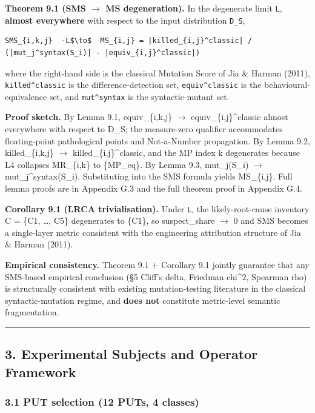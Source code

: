 \documentclass[review,12pt,authoryear]{elsarticle}
\begin{document}
\textbf{Theorem 9.1 (SMS $\to$ MS degeneration).} In the degenerate limit
\texttt{L}, \textbf{almost everywhere} with respect to the input
distribution \texttt{D\_S},

\begin{verbatim}
SMS_{i,k,j}  -L$\to$  MS_{i,j} = |killed_{i,j}^classic| / (|mut_j^syntax(S_i)| - |equiv_{i,j}^classic|)
\end{verbatim}

where the right-hand side is the classical Mutation Score of Jia \&
Harman (2011), \texttt{killed\^{}classic} is the difference-detection
set, \texttt{equiv\^{}classic} is the behavioural-equivalence set, and
\texttt{mut\^{}syntax} is the syntactic-mutant set.

\textbf{Proof sketch.} By Lemma 9.1, equiv\_\{i,k,j\} $\to$
equiv\_\{i,j\}\^{}classic almost everywhere with respect to D\_S; the
measure-zero qualifier accommodates floating-point pathological points
and Not-a-Number propagation. By Lemma 9.2, killed\_\{i,k,j\} $\to$
killed\_\{i,j\}\^{}classic, and the MP index k degenerates because L4
collapses MR\_\{i,k\} to \{MP\_eq\}. By Lemma 9.3, mut\_j(S\_i) $\to$
mut\_j\^{}syntax(S\_i). Substituting into the SMS formula yields
MS\_\{i,j\}. Full lemma proofs are in Appendix G.3 and the full theorem
proof in Appendix G.4.

\textbf{Corollary 9.1 (LRCA trivialisation).} Under \texttt{L}, the
likely-root-cause inventory C = \{C1, \ldots, C5\} degenerates to
\{C1\}, so suspect\_share $\to$ 0 and SMS becomes a single-layer metric
consistent with the engineering attribution structure of Jia \& Harman
(2011).

\textbf{Empirical consistency.} Theorem 9.1 + Corollary 9.1 jointly
guarantee that any SMS-based empirical conclusion (§5 Cliff's delta,
Friedman chi\^{}2, Spearman rho) is structurally consistent with
existing mutation-testing literature in the classical syntactic-mutation
regime, and \textbf{does not} constitute metric-level semantic
fragmentation.

\begin{center}\rule{0.5\linewidth}{0.5pt}\end{center}

\subsection{3. Experimental Subjects and Operator
Framework}\label{experimental-subjects-and-operator-framework}

\subsubsection{3.1 PUT selection (12 PUTs, 4
classes)}\label{put-selection-12-puts-4-classes}
\end{document}

